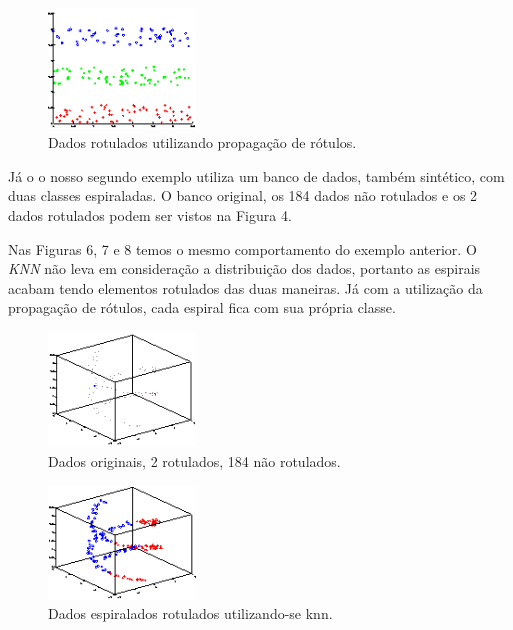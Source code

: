 \documentclass[12pt]{article}
\begin{document}
\begin{figure}[!h] \label{fig:horizontal3}
        \begin{center}
                \includegraphics[width=0.35\textwidth]{prop1-dados-rotu}
        \end{center}
        \caption{Dados rotulados utilizando propagação de rótulos.}
\end{figure}

Já o o nosso segundo exemplo utiliza um banco de dados, também sintético, com duas classes espiraladas. O banco original, os 184 dados não rotulados e os 2 dados rotulados podem ser vistos na Figura 4.

Nas Figuras 6, 7 e 8 temos o mesmo comportamento do exemplo anterior. O \emph{KNN} não leva em consideração a distribuição dos dados, portanto as espirais acabam tendo elementos rotulados das duas maneiras. Já com a utilização da propagação de rótulos, cada espiral fica com sua própria classe.

\begin{figure}[!h] \label{fig:horizontal21}
        \begin{center}
                \includegraphics[width=0.35\textwidth]{prop2-dados}
        \end{center}
        \caption{Dados originais, 2 rotulados, 184 não rotulados.}
\end{figure}

\begin{figure}[!h] \label{fig:horizontal22}
        \begin{center}
                \includegraphics[width=0.35\textwidth]{prop2-dados-knn}
        \end{center}
        \caption{Dados espiralados rotulados utilizando-se knn.}
\end{figure}
\end{document}
